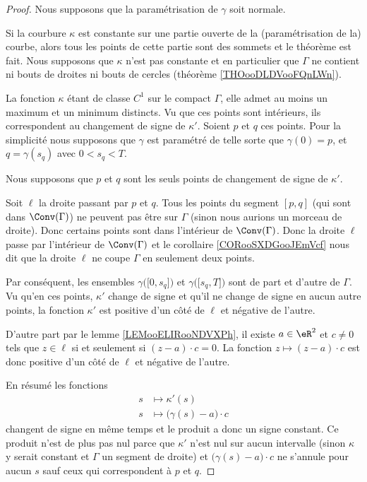 \begin{proof}
    Nous supposons que la paramétrisation de \( \gamma\) soit normale.

    Si la courbure \( \kappa\) est constante sur une partie ouverte de la (paramétrisation de la) courbe, alors tous les points de cette partie sont des sommets et le théorème est fait. Nous supposons que \( \kappa\) n'est pas constante et en particulier que \( \Gamma\) ne contient ni bouts de droites ni bouts de cercles (théorème \ref{THOooDLDVooFQnLWn}).

    La fonction \( \kappa\) étant de classe \( C^1\) sur le compact \( \Gamma\), elle admet au moins un maximum et un minimum distincts. Vu que ces points sont intérieurs, ils correspondent au changement de signe de \( \kappa'\). Soient \( p\) et \( q\) ces points. Pour la simplicité nous supposons que \( \gamma\) est paramétré de telle sorte que \( \gamma(0)=p\), et \( q=\gamma(s_q)\) avec \( 0<s_q<T\).

    Nous supposons que \( p\) et \( q\) sont les seuls points de changement de signe de \( \kappa'\).

    Soit \( \ell\) la droite passant par \( p\) et \( q\). Tous les points du segment \( [p,q]\) (qui sont dans \( \Conv(\Gamma)\)) ne peuvent pas être sur \( \Gamma\) (sinon nous aurions un morceau de droite). Donc certains points sont dans l'intérieur de \( \Conv(\Gamma)\). Donc la droite \( \ell\) passe par l'intérieur de \( \Conv(\Gamma)\) et le corollaire \ref{CORooSXDGooJEmVcf} nous dit que la droite \( \ell\) ne coupe \( \Gamma\) en seulement deux points.

    Par conséquent, les ensembles \( \gamma\big( \mathopen[ 0 , s_q \mathclose] \big)\) et \( \gamma\big( \mathopen[ s_q , T \mathclose] \big)\) sont de part et d'autre de \( \Gamma\). Vu qu'en ces points, \( \kappa'\) change de signe et qu'il ne change de signe en aucun autre points, la fonction \( \kappa'\) est positive d'un côté de \( \ell\) et négative de l'autre. 

    D'autre part par le lemme \ref{LEMooELIRooNDVXPh}, il existe \( a\in \eR^2\) et \( c\neq 0\) tels que \( z\in\ell\) si et seulement si \( (z-a)\cdot c=0\). La fonction \( z\mapsto (z-a)\cdot c\) est donc positive d'un côté de \( \ell\) et négative de l'autre.

    En résumé les fonctions 
    \begin{subequations}
        \begin{align}
            s&\mapsto \kappa'(s)\\
            s&\mapsto \big( \gamma(s)-a \big)\cdot c
        \end{align}
    \end{subequations}
    changent de signe en même temps et le produit a donc un signe constant. Ce produit n'est de plus pas nul parce que \( \kappa'\) n'est nul sur aucun intervalle (sinon \( \kappa\) y serait constant et \( \Gamma\) un segment de droite) et \( \big( \gamma(s)-a \big)\cdot c\) ne s'annule pour aucun \( s\) sauf ceux qui correspondent à \( p\) et \( q\).


\end{proof}
